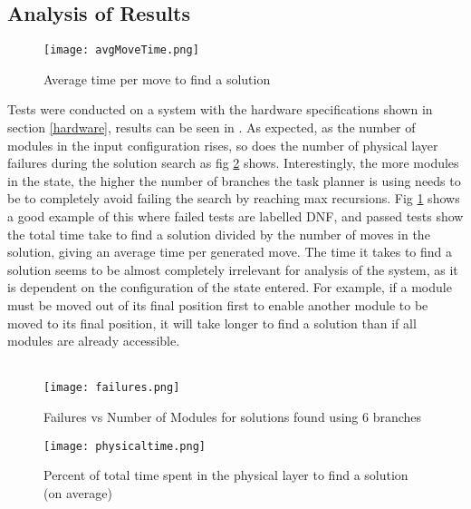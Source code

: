 \subsection{Analysis of Results}
\begin{figure}[H]
	\centering
	\texttt{[image: avgMoveTime.png]}
	\caption{Average time per move to find a solution}
	\label{avgMoveSol}
\end{figure}
Tests were conducted on a system with the hardware specifications shown in section \ref{hardware}, results can be seen in . As expected, as the number of modules in the input configuration rises, so does the number of physical layer failures during the solution search as fig \ref{failures} shows. Interestingly, the more modules in the state, the higher the number of branches the task planner is using needs to be to completely avoid failing the search by reaching max recursions. Fig \ref{avgMoveSol} shows a good example of this where failed tests are labelled DNF, and passed tests show the total time take to find a solution divided by the number of moves in the solution, giving an average time per generated move. The time it takes to find a solution seems to be almost completely irrelevant for analysis of the system, as it is dependent on the configuration of the state entered. For example, if a module must be moved out of its final position first to enable another module to be moved to its final position, it will take longer to find a solution than if all modules are already accessible.
\\\\
\begin{figure}[H]
	\centering
	\texttt{[image: failures.png]}
	\caption{Failures vs Number of Modules for solutions found using 6 branches}
	\label{failures}
\end{figure}
\begin{figure}[H]
	\centering
	\texttt{[image: physicaltime.png]}
	\caption{Percent of total time spent in the physical layer to find a solution (on average)}
	\label{physicalLayerTime}
\end{figure}